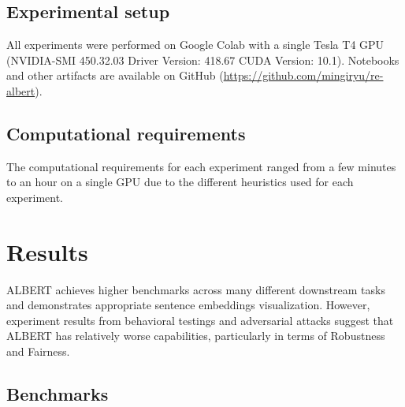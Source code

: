 \documentclass{article}
\begin{document}
\subsection{Experimental setup}

All experiments were performed on Google Colab with a single Tesla T4 GPU (NVIDIA-SMI 450.32.03 Driver Version: 418.67 CUDA Version: 10.1). Notebooks and other artifacts are available on GitHub (\url{https://github.com/mingiryu/re-albert}).

\subsection{Computational requirements}

The computational requirements for each experiment ranged from a few minutes to an hour on a single GPU due to the different heuristics used for each experiment.

\section{Results}

ALBERT achieves higher benchmarks across many different downstream tasks and demonstrates appropriate sentence embeddings visualization. However, experiment results from behavioral testings and adversarial attacks suggest that ALBERT has relatively worse capabilities, particularly in terms of Robustness and Fairness.

\subsection{Benchmarks}
\end{document}
